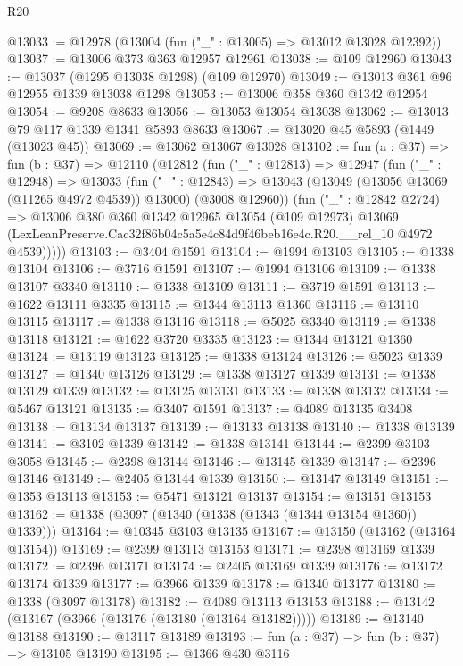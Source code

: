 \begin{lexlean}{R20}
\begin{coremodule}
@13033 := @12978 (@13004 (fun ("_" : @13005) => @13012 @13028 @12392))
@13037 := @13006 @373 @363 @12957 @12961
@13038 := @109 @12960
@13043 := @13037 (@1295 @13038 @1298) (@109 @12970)
@13049 := @13013 @361 @96 @12955 @1339 @13038 @1298
@13053 := @13006 @358 @360 @1342 @12954
@13054 := @9208 @8633
@13056 := @13053 @13054 @13038
@13062 := @13013 @79 @117 @1339 @1341 @5893 @8633
@13067 := @13020 @45 @5893 (@1449 (@13023 @45))
@13069 := @13062 @13067 @13028
@13102 := fun (a : @37) =>
  fun (b : @37) =>
  @12110
    (@12812
      (fun ("_" : @12813) =>
      @12947
        (fun ("_" : @12948) =>
        @13033
          (fun ("_" : @12843) =>
          @13043 (@13049 (@13056 @13069 (@11265 @4972 @4539)) @13000) (@3008 @12960))
          (fun ("_" : @12842 @2724) =>
          @13006
            @380
            @360
            @1342
            @12965
            @13054
            (@109 @12973)
            @13069
            (LexLeanPreserve.Cac32f86b04c5a5e4c84d9f46beb16e4c.R20.__rel_10 @4972 @4539)))))
@13103 := @3404 @1591
@13104 := @1994 @13103
@13105 := @1338 @13104
@13106 := @3716 @1591
@13107 := @1994 @13106
@13109 := @1338 @13107 @3340
@13110 := @1338 @13109
@13111 := @3719 @1591
@13113 := @1622 @13111 @3335
@13115 := @1344 @13113 @1360
@13116 := @13110 @13115
@13117 := @1338 @13116
@13118 := @5025 @3340
@13119 := @1338 @13118
@13121 := @1622 @3720 @3335
@13123 := @1344 @13121 @1360
@13124 := @13119 @13123
@13125 := @1338 @13124
@13126 := @5023 @1339
@13127 := @1340 @13126
@13129 := @1338 @13127 @1339
@13131 := @1338 @13129 @1339
@13132 := @13125 @13131
@13133 := @1338 @13132
@13134 := @5467 @13121
@13135 := @3407 @1591
@13137 := @4089 @13135 @3408
@13138 := @13134 @13137
@13139 := @13133 @13138
@13140 := @1338 @13139
@13141 := @3102 @1339
@13142 := @1338 @13141
@13144 := @2399 @3103 @3058
@13145 := @2398 @13144
@13146 := @13145 @1339
@13147 := @2396 @13146
@13149 := @2405 @13144 @1339
@13150 := @13147 @13149
@13151 := @1353 @13113
@13153 := @5471 @13121 @13137
@13154 := @13151 @13153
@13162 := @1338 (@3097 (@1340 (@1338 (@1343 (@1344 @13154 @1360)) @1339)))
@13164 := @10345 @3103 @13135
@13167 := @13150 (@13162 (@13164 @13154))
@13169 := @2399 @13113 @13153
@13171 := @2398 @13169 @1339
@13172 := @2396 @13171
@13174 := @2405 @13169 @1339
@13176 := @13172 @13174 @1339
@13177 := @3966 @1339
@13178 := @1340 @13177
@13180 := @1338 (@3097 @13178)
@13182 := @4089 @13113 @13153
@13188 := @13142 (@13167 (@3966 (@13176 (@13180 (@13164 @13182)))))
@13189 := @13140 @13188
@13190 := @13117 @13189
@13193 := fun (a : @37) => fun (b : @37) => @13105 @13190
@13195 := @1366 @430 @3116

\end{coremodule}
\end{lexlean}
